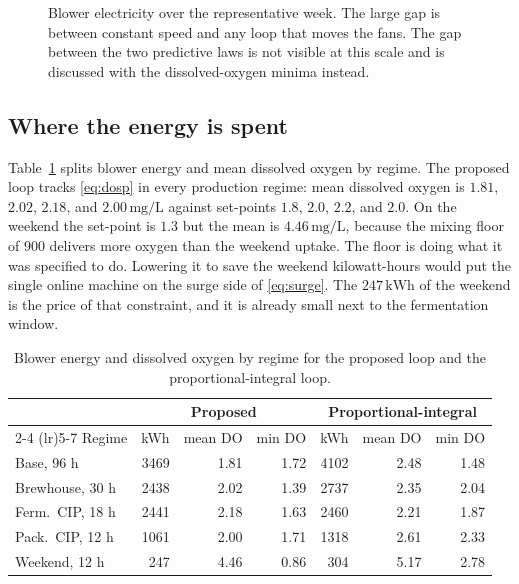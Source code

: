 \begin{figure}[ht]
\centering
{}
\caption{Blower electricity over the representative week. The large gap is between constant speed and any loop that moves the fans. The gap between the two predictive laws is not visible at this scale and is discussed with the dissolved-oxygen minima instead.}
\label{fig:energy-bars}
\end{figure}

\subsection{Where the energy is spent}

Table~\ref{tab:regenergy} splits blower energy and mean dissolved oxygen by regime. The proposed loop tracks \eqref{eq:dosp} in every production regime: mean dissolved oxygen is $1.81$, $2.02$, $2.18$, and $2.00\,\mathrm{mg/L}$ against set-points $1.8$, $2.0$, $2.2$, and $2.0$. On the weekend the set-point is $1.3$ but the mean is $4.46\,\mathrm{mg/L}$, because the mixing floor of \SI{900}{\nmcph} delivers more oxygen than the weekend uptake. The floor is doing what it was specified to do. Lowering it to save the weekend kilowatt-hours would put the single online machine on the surge side of \eqref{eq:surge}. The $247\,\mathrm{kWh}$ of the weekend is the price of that constraint, and it is already small next to the fermentation window.

\begin{table}[ht]
\centering
\caption{Blower energy and dissolved oxygen by regime for the proposed loop and the proportional-integral loop.}
\label{tab:regenergy}
\begin{tabular}{@{}lrrrrrr@{}}
\toprule
 & \multicolumn{3}{c}{Proposed} & \multicolumn{3}{c}{Proportional-integral} \\
\cmidrule(lr){2-4} \cmidrule(lr){5-7}
Regime & kWh & mean DO & min DO & kWh & mean DO & min DO \\
\midrule
Base, 96 h & 3469 & 1.81 & 1.72 & 4102 & 2.48 & 1.48 \\
Brewhouse, 30 h & 2438 & 2.02 & 1.39 & 2737 & 2.35 & 2.04 \\
Ferm.\ CIP, 18 h & 2441 & 2.18 & 1.63 & 2460 & 2.21 & 1.87 \\
Pack.\ CIP, 12 h & 1061 & 2.00 & 1.71 & 1318 & 2.61 & 2.33 \\
Weekend, 12 h & 247 & 4.46 & 0.86 & 304 & 5.17 & 2.78 \\
\bottomrule
\end{tabular}
\end{table}

